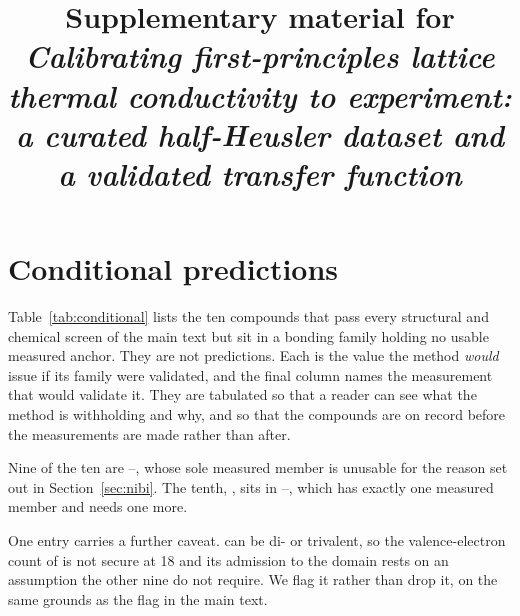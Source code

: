 \documentclass[preprint, 12pt]{elsarticle}
\begin{document}
\begin{frontmatter}
\title{Supplementary material for\\
       \emph{Calibrating first-principles lattice thermal conductivity to experiment:
       a curated half-Heusler dataset and a validated transfer function}}
\end{frontmatter}

\section{Conditional predictions}
\label{sec:conditional}

Table~\ref{tab:conditional} lists the ten compounds that pass every structural and chemical screen
of the main text but sit in a bonding family holding no usable measured anchor. They are not
predictions. Each is the value the method \emph{would} issue if its family were validated, and the
final column names the measurement that would validate it. They are tabulated so that a reader can
see what the method is withholding and why, and so that the compounds are on record before the
measurements are made rather than after.

Nine of the ten are --, whose sole measured member is unusable for the reason set out
in Section~\ref{sec:nibi}. The tenth, , sits in --, which has exactly one
measured member and needs one more.

One entry carries a further caveat.  can be di- or trivalent, so the valence-electron count
of  is not secure at 18 and its admission to the domain rests on an assumption the other
nine do not require. We flag it rather than drop it, on the same grounds as the  flag in the
main text.
\end{document}
